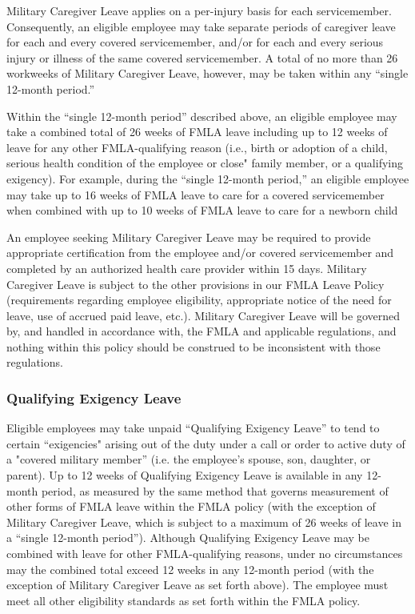 Military Caregiver Leave applies on a per-injury basis for each servicemember. Consequently, an eligible employee may take separate periods of caregiver leave for each and every covered servicemember, and/or for each and every serious injury or illness of the same covered servicemember. A total of no more than 26 workweeks of Military Caregiver Leave, however, may be taken within any “single 12-month period.”

Within the “single 12-month period” described above, an eligible employee may take a combined total of 26 weeks of FMLA leave including up to 12 weeks of leave for any other FMLA-qualifying reason (i.e., birth or adoption of a child, serious health condition of the employee or close" family member, or a qualifying exigency). For example, during the “single 12-month period,” an eligible employee may take up to 16 weeks of FMLA leave to care for a covered servicemember when combined with up to 10 weeks of FMLA leave to care for a newborn child

An employee seeking Military Caregiver Leave may be required to provide appropriate certification from the employee and/or covered servicemember and completed by an authorized health care provider within 15 days. Military Caregiver Leave is subject to the other provisions in our FMLA Leave Policy (requirements regarding employee eligibility, appropriate notice of the need for leave, use of accrued paid leave, etc.). Military Caregiver Leave will be governed by, and handled in accordance with, the FMLA and applicable regulations, and nothing within this policy should be construed to be inconsistent with those regulations.

\subsubsection{Qualifying Exigency Leave}

Eligible employees may take unpaid “Qualifying Exigency Leave” to tend to certain “exigencies" arising out of the duty under a call or order to active duty of a "covered military member” (i.e. the employee's spouse, son, daughter, or parent). Up to 12 weeks of Qualifying Exigency Leave is available in any 12-month period, as measured by the same method that governs measurement of other forms of FMLA leave within the FMLA policy (with the exception of Military Caregiver Leave, which is subject to a maximum of 26 weeks of leave in a “single 12-month period”). Although Qualifying Exigency Leave may be combined with leave for other FMLA-qualifying reasons, under no circumstances may the combined total exceed 12 weeks in any 12-month period (with the exception of Military Caregiver Leave as set forth above). The employee must meet all other eligibility standards as set forth within the FMLA policy.

